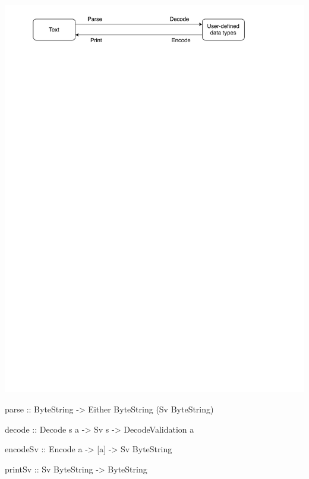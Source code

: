 \documentclass[UKenglish,usenames,dvipsnames,svgnames,table,aspectratio=169,mathserif]{beamer}
\newcommand{\nl}{\vspace{\baselineskip}}
\begin{document}
\begin{frame}
\centering \nl \nl \nl \nl \nl
\includegraphics[scale=0.8]{diagrams/parsedecodeencodeprint3.pdf}
\end{frame}


\begin{frame}[fragile]
\begin{haskellcode}
parse :: ByteString -> Either ByteString (Sv ByteString)
\end{haskellcode}
\nl
\begin{haskellcode}
decode :: Decode s a -> Sv s -> DecodeValidation a
\end{haskellcode}
\nl
\begin{haskellcode}
encodeSv :: Encode a -> [a] -> Sv ByteString
\end{haskellcode}
\nl
\begin{haskellcode}
printSv :: Sv ByteString -> ByteString
\end{haskellcode}
\end{frame}
\end{document}
